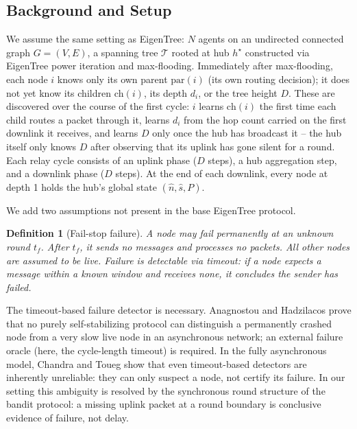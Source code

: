 \documentclass{article}
\newtheorem{definition}{Definition}
\newcommand{\merw}{EigenTree}
\begin{document}
\subsection{Background and Setup}
\label{sec:ft-setup}

We assume the same setting as \merw: $N$ agents on an undirected connected graph $G = (V, E)$, a spanning tree $\mathcal{T}$ rooted at hub $h^\star$ constructed via \merw{} power iteration and max-flooding. Immediately after max-flooding, each node $i$ knows only its own parent $\mathrm{par}(i)$ (its own routing decision); it does not yet know its children $\mathrm{ch}(i)$, its depth $d_i$, or the tree height $D$. These are discovered over the course of the first cycle: $i$ learns $\mathrm{ch}(i)$ the first time each child routes a packet through it, learns $d_i$ from the hop count carried on the first downlink it receives, and learns $D$ only once the hub has broadcast it -- the hub itself only knows $D$ after observing that its uplink has gone silent for a round. Each relay cycle consists of an uplink phase ($D$ steps), a hub aggregation step, and a downlink phase ($D$ steps). At the end of each downlink, every node at depth 1 holds the hub's global state $(\hat{n}, \hat{s}, P)$.

We add two assumptions not present in the base \merw{} protocol.

\begin{definition}[Fail-stop failure]
    A node may fail permanently at an unknown round $t_f$. After $t_f$, it sends no
    messages and processes no packets. All other nodes are assumed to be live. Failure
    is detectable via timeout: if a node expects a message within a known window and
    receives none, it concludes the sender has failed.
\end{definition}

The timeout-based failure detector is necessary. Anagnostou and Hadzilacos
\citep{anagnostou1993} prove that no purely self-stabilizing protocol can distinguish a
permanently crashed node from a very slow live node in an asynchronous network; an
external failure oracle (here, the cycle-length timeout) is required. In the fully
asynchronous model, Chandra and Toueg \citep{chandratoueg1996} show that even
timeout-based detectors are inherently unreliable: they can only suspect a node, not
certify its failure. In our setting this ambiguity is resolved by the synchronous round
structure of the bandit protocol: a missing uplink packet at a round boundary is
conclusive evidence of failure, not delay.
\end{document}

